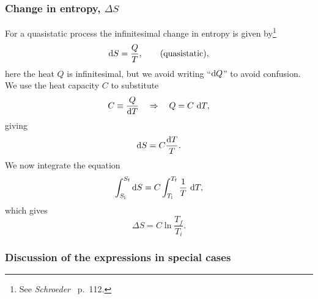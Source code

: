 \documentclass[a4paper, 11pt, titlepage, english]{article}
\newcommand{\beq}{\begin{equation}}
\newcommand{\eeq}{\end{equation}}
\begin{document}
\subsubsection*{Change in entropy, $\Delta S$}
For a quasistatic process the infinitesimal change in entropy is given by\footnote{See {\it Schroeder\ } p.\ 112.}
$${\rm d}S = \frac{Q}{T}, \qquad {\rm (quasistatic)},$$
here the heat $Q$ is infinitesimal, but we avoid writing ``${\rm d}Q$'' to avoid confusion. We use the heat capacity $C$ to substitute 
$$C \equiv \frac{Q}{{\rm d}T} \quad \Rightarrow \quad Q = C {\rm\ d}T,$$
giving
$${\rm d}S = C \frac{{\rm d}T}{T}.$$
We now integrate the equation
$$\int_{S_{\rm i}}^{S_{\rm f}} {\rm d}S = C\int_{T_{\rm i}}^{T_{\rm f}} \frac{1}{T}{\rm\ d}T,$$
which gives
\beq
\Delta  S = C\ln\frac{T_f}{T_i}.
\eeq

\subsubsection*{Discussion of the expressions in special cases}
\end{document}
